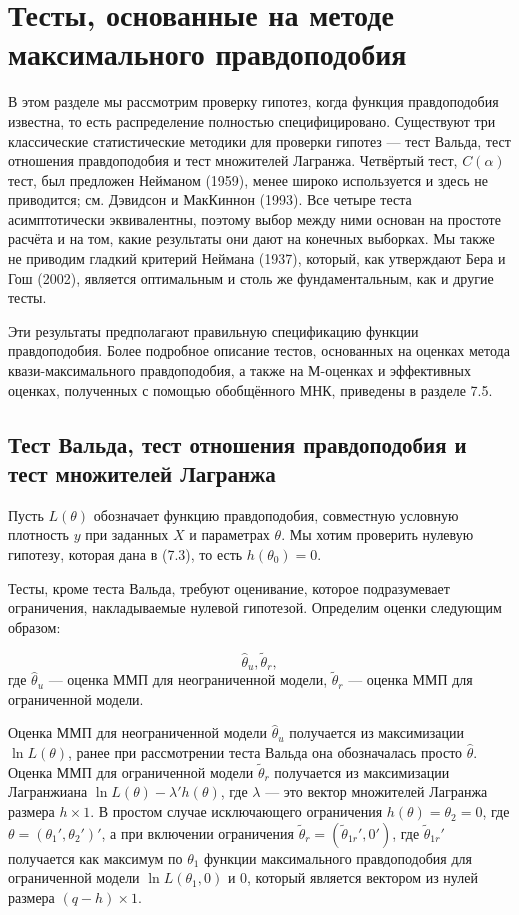 \section{Тесты, основанные на методе максимального правдоподобия}

В этом разделе мы рассмотрим проверку гипотез, когда функция правдоподобия известна, то есть распределение полностью специфицировано. Существуют три классические статистические методики для проверки гипотез --- тест Вальда, тест отношения правдоподобия и тест множителей Лагранжа. Четвёртый тест, $C(\alpha)$ тест, был предложен Нейманом (1959), менее широко используется и здесь не приводится; см. Дэвидсон и МакКиннон (1993). Все четыре теста асимптотически эквивалентны, поэтому выбор между ними основан на простоте расчёта и на том, какие результаты они дают на конечных выборках. Мы также не приводим гладкий критерий Неймана (1937), который, как утверждают Бера и Гош (2002), является оптимальным и столь же фундаментальным, как и другие тесты.

Эти результаты предполагают правильную спецификацию функции правдоподобия. Более подробное описание тестов, основанных на оценках метода квази-максимального правдоподобия, а также на М-оценках и эффективных оценках, полученных с помощью обобщённого МНК, приведены в разделе 7.5.

\subsection{Тест Вальда, тест отношения правдоподобия и тест множителей Лагранжа}

Пусть $L(\theta)$ обозначает функцию правдоподобия, совместную условную плотность $y$ при заданных $X$ и параметрах $\theta$. Мы хотим проверить нулевую гипотезу, которая дана в (7.3), то есть  $h(\theta_0) = 0$.

Тесты, кроме теста Вальда, требуют оценивание, которое подразумевает ограничения, накладываемые нулевой гипотезой. Определим оценки следующим образом:

\begin{equation}
\hat{\theta}_u,
\tilde{\theta}_r,
\end{equation}
где $\hat{\theta}_u$ --- оценка ММП для неограниченной модели, $\tilde{\theta}_r$ --- оценка ММП для ограниченной модели.

Оценка ММП для неограниченной модели $\hat{\theta}_u$ получается из максимизации $\ln L(\theta)$, ранее при рассмотрении теста Вальда она обозначалась просто $\hat{\theta}$. Оценка ММП для ограниченной модели $\tilde{\theta}_r$ получается из максимизации Лагранжиана $\ln L(\theta) - \lambda'h(\theta)$, где $\lambda$ --- это вектор множителей Лагранжа размера $h \times 1$. В простом случае исключающего ограничения $h(\theta) = \theta_2 = 0$, где $\theta = (\theta_1', \theta_2')'$, а при включении ограничения $\tilde{\theta}_r = (\tilde{\theta}_{1r}',0')$, где $\tilde{\theta}_{1r}'$ получается как максимум по $\theta_1$ функции максимального правдоподобия для ограниченной модели $\ln L(\theta_1, 0)$ и $0$, который является вектором из нулей размера $(q - h) \times 1$.

